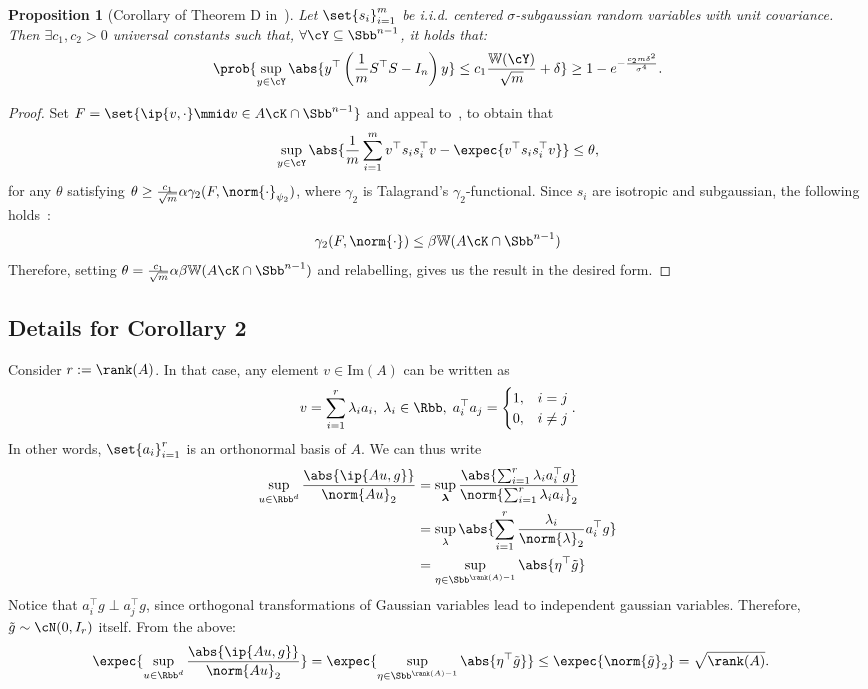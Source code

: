 \documentclass[a4paper]{article}
\newtheorem{proposition}{Proposition}
\begin{document}
\begin{proposition}[Corollary of Theorem D in~\cite{MenPajTom07}]
    Let $\set{s_i}_{i=1}^m$ be i.i.d. centered $\sigma$-subgaussian random
    variables with unit covariance. Then $\exists c_1, c_2 > 0$ universal
    constants such that, $\forall \cY \subseteq \Sbb^{n - 1}$, it holds that:
    \[
        \prob{\sup_{y \in \cY} \abs{y^\top \left(
            \frac{1}{m} S^\top S - I_n
        \right) y} \leq c_1 \frac{\mathbb{W}(\cY)}{\sqrt{m}} + \delta
        } \geq 1 - e^{-\frac{c_2 m \delta^2}{\sigma^4}}.
    \]
\end{proposition}
\begin{proof}
    Set $F = \set{\ip{v, \cdot} \mmid v \in A \cK \cap \Sbb^{n-1}}$ and appeal
    to~\cite[Theorem D]{MenPajTom07}, to obtain that
    \[
        \sup_{y \in \cY} \abs{\frac{1}{m} \sum_{i=1}^m
        v^\top s_i s_i^\top v - \expec{v^\top s_i s_i^\top v}}
        \leq \theta,
    \]
    for any $\theta$ satisfying $\theta \geq \frac{c_1}{\sqrt{m}} \alpha
    \gamma_2(F, \norm{\cdot}_{\psi_2})$, where $\gamma_2$ is Talagrand's
    $\gamma_2$-functional. Since $s_i$ are isotropic and subgaussian, the
    following holds~\cite[Section 2]{MenPajTom07}:
    \[
        \gamma_2(F, \norm{\cdot}) \leq
        \beta \mathbb{W}(A \cK \cap \Sbb^{n - 1})
    \]
    Therefore, setting $\theta = \frac{c_1}{\sqrt{m}} \alpha \beta
    \mathbb{W}(A \cK \cap \Sbb^{n-1})$ and relabelling, gives us the result
    in the desired form.
\end{proof}

\subsection*{Details for Corollary 2}
Consider $r := \rank(A)$. In that case, any element $v \in \mathrm{Im}(A)$ can
be written as
\[
    v = \sum_{i=1}^{r} \lambda_i a_i, \; \lambda_i \in \Rbb,
    \; a_i^\top a_j = \begin{cases}
        1, & i = j \\
        0, & i \neq j
    \end{cases}.
\]
In other words, $\set{a_i}_{i=1}^r$ is an orthonormal basis of $A$. We can thus
write
\begin{align*}
    \sup_{u \in \Rbb^d} \frac{\abs{\ip{Au, g}}}{\norm{Au}_2} &=
    \sup_{\bm{\lambda}} \frac{\abs{\sum_{i=1}^r \lambda_i a_i^\top g}}{
        \norm{\sum_{i=1}^r \lambda_i a_i}_2} \\
    &= \sup_{\lambda}
        \abs{\sum_{i=1}^r \frac{\lambda_i}{\norm{\lambda}_2} a_i^\top g} \\
    &= \sup_{\eta \in \Sbb^{\rank(A) - 1}} \abs{\eta^\top \tilde{g}}
\end{align*}
Notice that $a_i^\top g \perp a_j^\top g$, since orthogonal transformations of
Gaussian variables lead to independent gaussian variables. Therefore,
$\tilde{g} \sim \cN(0, I_r)$ itself. From the above:
\begin{align*}
    \expec{\sup_{u \in \Rbb^d} \frac{\abs{\ip{Au, g}}}{\norm{Au}_2}} &=
    \expec{\sup_{\eta \in \Sbb^{\rank(A) - 1}} \abs{\eta^\top \tilde{g}}} \leq
    \expec{\norm{\tilde{g}}_2} =
    \sqrt{\rank(A)}.
\end{align*}
\end{document}
